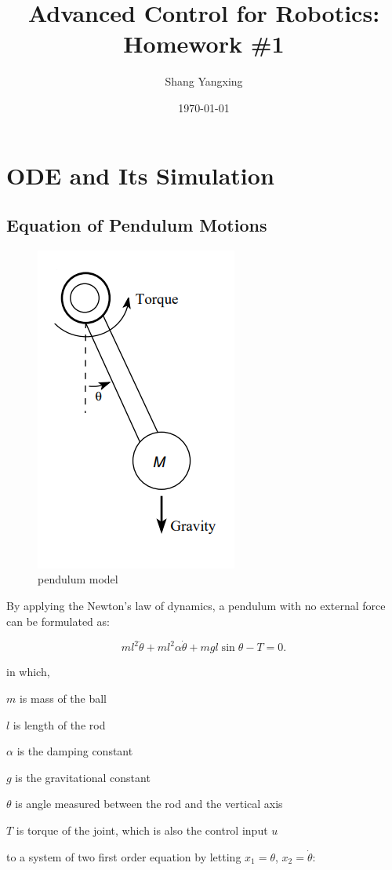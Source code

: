 \documentclass[titlepage]{article}
\title{\textbf{Advanced Control for Robotics: Homework \#1}}
\author{Shang Yangxing}
\date{\today}
\begin{document}
\maketitle

\section{ODE and Its Simulation}

\subsection{Equation of Pendulum Motions}

\begin{figure}[htbp]
    \centering
    \includegraphics[width=.3\textwidth]{img/pendulum.png}
    \caption{pendulum model}
    \label{fig:pendulum}
\end{figure}

By applying the Newton's law of dynamics, a pendulum with no external force can be formulated as:

\begin{equation}
    ml^2 \ddot{\theta} + ml^2 \alpha \dot{\theta} + mgl \sin{\theta} - T = 0.
\end{equation}

in which,

\quad $m$ is mass of the ball

\quad $l$ is length of the rod

\quad $\alpha$ is the damping constant

\quad $g$ is the gravitational constant

\quad $\theta$ is angle measured between the rod and the vertical axis

\quad $T$ is torque of the joint, which is also the control input $u$

to a system of two first order equation by letting $x_1=\theta$, $x_2=\dot{\theta}$:
\end{document}
